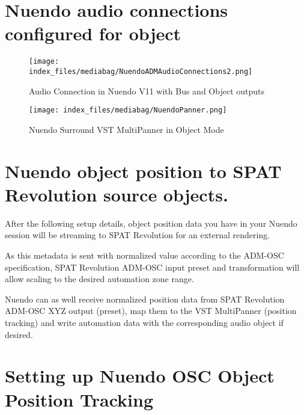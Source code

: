 \documentclass[
  letterpaper,
  DIV=11,
  numbers=noendperiod]{scrreport}
\begin{document}
\hypertarget{nuendo-audio-connections-configured-for-object}{%
\section{Nuendo audio connections configured for
object}\label{nuendo-audio-connections-configured-for-object}}

\begin{figure}

{\centering \texttt{[image: index\_files/mediabag/NuendoADMAudioConnections2.png]}

}

\caption{Audio Connection in Nuendo V11 with Bus and Object outputs}

\end{figure}

\begin{figure}

{\centering \texttt{[image: index\_files/mediabag/NuendoPanner.png]}

}

\caption{Nuendo Surround VST MultiPanner in Object Mode}

\end{figure}

\hypertarget{nuendo-object-position-to-spat-revolution-source-objects.}{%
\section{Nuendo object position to SPAT Revolution source
objects.}\label{nuendo-object-position-to-spat-revolution-source-objects.}}

After the following setup details, object position data you have in your
Nuendo session will be streaming to SPAT Revolution for an external
rendering.

As this metadata is sent with normalized value according to the ADM-OSC
specification, SPAT Revolution ADM-OSC input preset and transformation
will allow scaling to the desired automation zone range.

Nuendo can as well receive normalized position data from SPAT Revolution
ADM-OSC XYZ output (preset), map them to the VST MultiPanner (position
tracking) and write automation data with the corresponding audio object
if desired.

\hypertarget{setting-up-nuendo-osc-object-position-tracking}{%
\section{Setting up Nuendo OSC Object Position
Tracking}\label{setting-up-nuendo-osc-object-position-tracking}}
\end{document}
